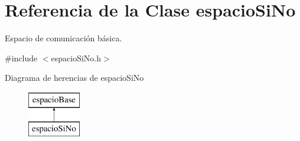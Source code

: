 \hypertarget{classespacio_si_no}{}\section{Referencia de la Clase espacio\+Si\+No}
\label{classespacio_si_no}


Espacio de comunicación básica.  




{\ttfamily \#include $<$espacio\+Si\+No.\+h$>$}

Diagrama de herencias de espacio\+Si\+No\begin{figure}[H]
\begin{center}
\leavevmode
\includegraphics[height=2.000000cm]{classespacio_si_no}
\end{center}
\end{figure}
